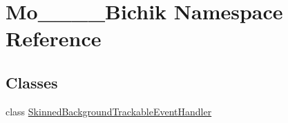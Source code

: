 \hypertarget{namespace_mo__2015__11__30___bichik}{}\section{Mo\+\_\+\_\+\_\+\_\+\+Bichik Namespace Reference}
\label{namespace_mo__2015__11__30___bichik}
\subsection*{Classes}
\begin{DoxyCompactItemize}
\item 
class \hyperlink{class_mo__2015__11__30___bichik_1_1_skinned_background_trackable_event_handler}{Skinned\+Background\+Trackable\+Event\+Handler}
\end{DoxyCompactItemize}
